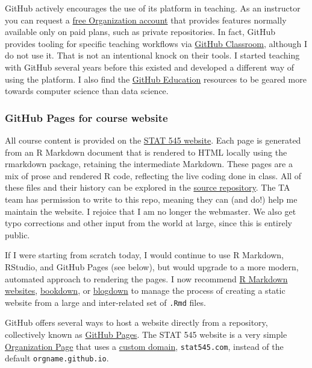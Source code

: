 \documentclass[12pt]{article}
\begin{document}
GitHub actively encourages the use of its platform in teaching. As an
instructor you can request a
\href{https://help.github.com/articles/discounted-organization-accounts/}{free
Organization account} that provides features normally available only on
paid plans, such as private repositories. In fact, GitHub provides
tooling for specific teaching workflows via
\href{https://classroom.github.com/}{GitHub Classroom}, although I do
not use it. That is not an intentional knock on their tools. I started
teaching with GitHub several years before this existed and developed a
different way of using the platform. I also find the
\href{https://education.github.com}{GitHub Education} resources to be
geared more towards computer science than data science.

\subsubsection{GitHub Pages for course
website}\label{github-pages-for-course-website}

All course content is provided on the \href{http://stat545.com}{STAT 545
website}. Each page is generated from an R Markdown document that is
rendered to HTML locally using the rmarkdown package, retaining the
intermediate Markdown. These pages are a mix of prose and rendered R
code, reflecting the live coding done in class. All of these files and
their history can be explored in the
\href{https://github.com/STAT545-UBC/STAT545-UBC.github.io}{source
repository}. The TA team has permission to write to this repo, meaning
they can (and do!) help me maintain the website. I rejoice that I am no
longer the webmaster. We also get typo corrections and other input from
the world at large, since this is entirely public.

If I were starting from scratch today, I would continue to use R
Markdown, RStudio, and GitHub Pages (see below), but would upgrade to a
more modern, automated approach to rendering the pages. I now recommend
\href{http://rmarkdown.rstudio.com/rmarkdown_websites.html}{R Markdown
websites}, \href{https://bookdown.org}{bookdown}, or
\href{https://bookdown.org/yihui/blogdown/}{blogdown} to manage the
process of creating a static website from a large and inter-related set
of \texttt{.Rmd} files.

GitHub offers several ways to host a website directly from a repository,
collectively known as
\href{https://help.github.com/categories/github-pages-basics/}{GitHub
Pages}. The STAT 545 website is a very simple
\href{https://help.github.com/articles/user-organization-and-project-pages/}{Organization
Page} that uses a
\href{https://help.github.com/articles/custom-domain-redirects-for-github-pages-sites/}{custom
domain}, \texttt{stat545.com}, instead of the default
\texttt{orgname.github.io}.
\end{document}
